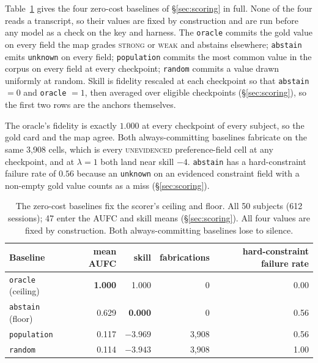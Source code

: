 \documentclass{article}
\begin{document}
Table~\ref{tab:gate} gives the four zero-cost baselines of \S\ref{sec:scoring} in full. None of the four
reads a transcript, so their values are fixed by construction and are
run before any model as a check on the key and harness. The \texttt{oracle} commits the gold value on
every field the map grades \textsc{strong} or \textsc{weak} and abstains elsewhere; \texttt{abstain}
emits \texttt{unknown} on every field; \texttt{population} commits the most common value in the
corpus on every field at every checkpoint; \texttt{random} commits a value drawn uniformly at random.
Skill is fidelity rescaled at each checkpoint so that \texttt{abstain} $=0$ and \texttt{oracle}
$=1$, then averaged over eligible checkpoints (\S\ref{sec:scoring}), so the first two rows are the
anchors themselves.

The oracle's fidelity is exactly $1.000$ at every checkpoint of every subject, so the gold card and
the map agree. Both always-committing baselines fabricate on the same 3,908 cells, which is every
\textsc{unevidenced} preference-field cell at any checkpoint, and at $\lambda=1$ both land near
skill $-4$. \texttt{abstain} has a hard-constraint failure rate of $0.56$ because an
\texttt{unknown} on an evidenced constraint field with a non-empty gold value counts as a miss
(\S\ref{sec:scoring}).

\begin{table}[h]
  \centering
  \caption{The zero-cost baselines fix the scorer's ceiling and floor. All 50 subjects (612 sessions); 47
  enter the AUFC and skill means (\S\ref{sec:scoring}). All four values are fixed by construction.
  Both always-committing baselines lose to silence.}
  \label{tab:gate}
  \begin{tabular}{@{}lrrrr@{}}
    \toprule
    Baseline & mean AUFC & skill & fabrications & hard-constraint failure rate \\
    \midrule
    \texttt{oracle} (ceiling)     & \textbf{1.000} & 1.000  & 0    & 0.00 \\
    \texttt{abstain} (floor)      & 0.629 & \textbf{0.000} & 0    & 0.56 \\
    \texttt{population}           & 0.117 & $-3.969$ & 3,908 & 0.56 \\
    \texttt{random}               & 0.114 & $-3.943$ & 3,908 & 1.00 \\
    \bottomrule
  \end{tabular}
\end{table}

\end{document}
